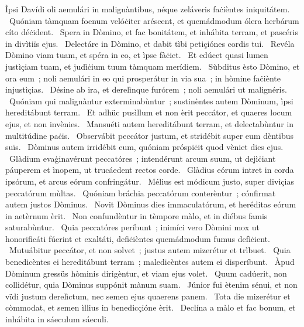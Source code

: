 { Ìpsi Davídi}
{%
oli aemulári in malignàntibus, néque zeláveris faċièntes iniquitátem. 
~Quóniam tàmquam foenum velóċiter aréscent, et quemádmodum ólera herbárum cíto déċident. 
~Spera in Dòmino, et fac bonitátem, et inhábita terram, et pascéris in divìtiïs ejus. 
~Delectáre in Dòmino, et dabit tìbi petiçiónes cordis tui. 
~Revéla Dòmino viam tuam, et spéra in eo, et ìpse fàċiet. 
~Et edúcet quasi lumen justìçiam tuam, et judìċium tuum tàmquam merídiem. 
~Sùbditus èsto Dòmino, et ora eum~; noli aemulári in eo qui prosperátur in via sua~; in hòmine faċiènte injustìçias. 
~Désine ab ira, et derelìnque furórem~; noli aemulári ut malignéris. 
~Quóniam qui malignàntur exterminabùntur~; sustinèntes autem Dòminum, ìpsi hereditábunt terram. 
~Et adhüc pusìllum et non èrit peccátor, et quaeres locum ejus, et non invènies. 
~Mansuéti autem hereditábunt terram, et delectabùntur in multitúdine paċis. 
~Observábit peccátor justum, et stridébit super eum dèntibus suïs. 
~Dòminus autem irridébit eum, quóniam próspiċit quod vèniet dies ejus. 
~Glàdium evaġinavérunt peccatóres~; intendérunt arcum suum, ut dejìċiant páuperem et ìnopem, ut trucáedent rectos corde. 
~Glàdius eórum intret in corda ipsórum, et arcus eórum confringátur. 
~Mélius est módicum justo, super divìçias peccatórum mùltas. 
~Quóniam bráchia peccatórum conterèntur~; cónfirmat autem justos Dòminus. 
~Novit Dòminus dies immaculatórum, et heréditas eórum in aetèrnum èrit. 
~Non confundèntur in tèmpore màlo, et in diébus famis saturabùntur. 
~Quia peccatóres períbunt~; inimíci vero Dòmini mox ut honorificáti fúerint et exaltáti, defiċièntes quemádmodum fumus defìċient. 
~Mutuábitur peccátor, et non solvet~; justus autem mizerétur et trìbuet. 
~Quia benedicèntes ei hereditábunt terram~; maledicèntes autem ei disperíbunt. 
~Àpud Dòminum gressüs hòminis dirigèntur, et viam ejus volet. 
~Quum cadúerit, non collidétur, quia Dòminus suppónit mànum suam. 
~Júnior fui ètenim sénui, et non vïdi justum derelìctum, nec semen ejus quaerens panem. 
~Tota die mizerétur et còmmodat, et semen ìllius in benedicçióne èrit. 
~Declína a màlo et fac bonum, et inhábita in sáeculum sáeculi. 
}
